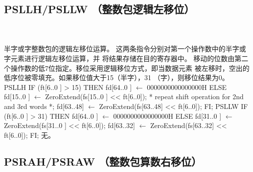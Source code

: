 \subsection{PSLLH/PSLLW （整数包逻辑左移位）}

\begin{instructionblk}
   \\
   \\
  {半字或字整数包的逻辑左移位运算。}
  {这两条指令分别对第一个操作数中的半字或字元素进行逻辑左移位运算，并
  将结果存储在目的寄存器中。
  移动的位数由第二个操作数的低7位指定。移位采用逻辑移位方式，即当数据元素
  被左移时，空出的低序位被零填充。如果移位值大于15（半字），31
  （字），则移位结果为0。}
  {PSLLH \narrownewline
  IF (ft[6..0 ] > 15) \narrownewline
  THEN \narrownewline
  \mbox{\hspace{.5cm}} fd[64..0 ] $\leftarrow$ 0000000000000000H \narrownewline
  ELSE \narrownewline
  \mbox{\hspace{.5cm}} fd[15..0 ] $\leftarrow$ ZeroExtend(fs[15..0 ] << ft[6..0]); \narrownewline
  \mbox{\hspace{.5cm}} * repeat shift operation for 2nd and 3rd words *; \narrownewline
  \mbox{\hspace{.5cm}} fd[63..48] $\leftarrow$ ZeroExtend(fs[63..48] << ft[6..0]); \narrownewline
  FI; \narrownewline \narrownewline
  PSLLW \narrownewline
  IF (ft[6..0 ] > 31) \narrownewline
  THEN \narrownewline
  \mbox{\hspace{.5cm}} fd[64..0 ] $\leftarrow$ 0000000000000000H \narrownewline
  ELSE \narrownewline
  \mbox{\hspace{.5cm}} fd[31..0 ] $\leftarrow$ ZeroExtend(fs[31..0 ] << ft[6..0]); \narrownewline
  \mbox{\hspace{.5cm}} fd[63..32] $\leftarrow$ ZeroExtend(fs[63..32] << ft[6..0]); \narrownewline
  FI;}
  {无。}
\end{instructionblk}

\subsection{PSRAH/PSRAW （整数包算数右移位）}

